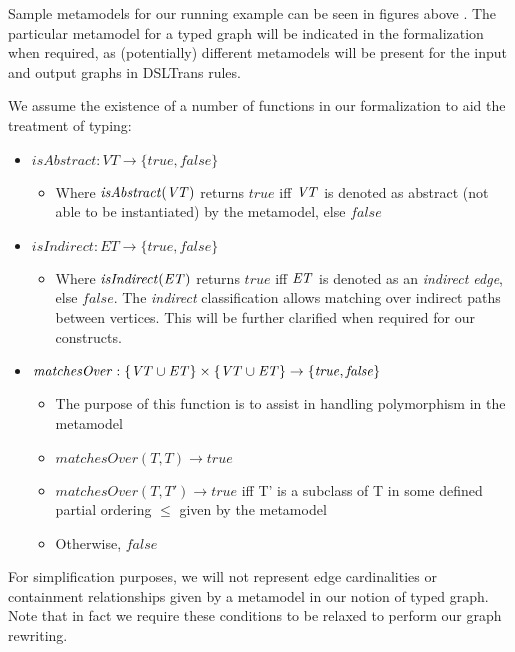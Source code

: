 Sample metamodels for our running example can be seen in figures above . The particular metamodel for a typed graph will be indicated in the formalization when required, as (potentially) different metamodels will be present for the input and output graphs in DSLTrans rules.

We assume the existence of a number of functions in our formalization to aid the treatment of typing:

\begin{itemize}
\item $\mathit{isAbstract}: \mathit{VT} \rightarrow \{\mathit{true}, \mathit{false}\}$
\begin{itemize}
\item Where $\mathit{isAbstract}(\mathit{VT})$ returns $\mathit{true}$ iff $\mathit{VT}$ is denoted as abstract (not able to be instantiated) by the metamodel, else $\mathit{false}$
\end{itemize}

\item $\mathit{isIndirect}: \mathit{ET} \rightarrow \{\mathit{true}, \mathit{false}\}$
\begin{itemize}
\item Where $\mathit{isIndirect}(\mathit{ET})$ returns $\mathit{true}$ iff $\mathit{ET}$ is denoted as an \textit{indirect edge}, else $\mathit{false}$. The \textit{indirect} classification allows matching over indirect paths between vertices. This will be further clarified when required for our constructs.
\end{itemize}

\item $\mathit{matchesOver}: \{\mathit{VT} \cup \mathit{ET}\} \times \{\mathit{VT} \cup \mathit{ET}\} \rightarrow \{\mathit{true}, \mathit{false}\}$

\begin{itemize}
\item The purpose of this function is to assist in handling polymorphism in the metamodel
\item $\mathit{matchesOver}(T, T) \rightarrow \mathit{true}$
\item $\mathit{matchesOver}(T, T') \rightarrow \mathit{true}$ iff T' is a subclass of T in some defined partial ordering $\leq$ given by the metamodel
\item Otherwise, $\mathit{false}$
\end{itemize}
\end{itemize}

For simplification purposes, we will not represent edge cardinalities or containment relationships given by a metamodel in our notion of typed graph. Note that in fact we require these conditions to be relaxed to perform our graph rewriting.

